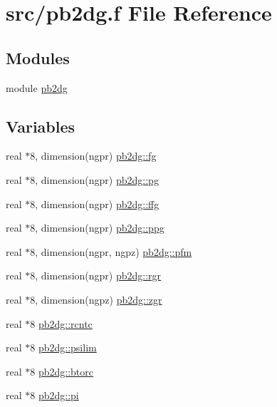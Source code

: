 \hypertarget{pb2dg_8f}{
\section{src/pb2dg.f File Reference}
\label{pb2dg_8f}
}
\subsection*{Modules}
\begin{CompactItemize}
\item 
module \hyperlink{namespacepb2dg}{pb2dg}
\end{CompactItemize}
\subsection*{Variables}
\begin{CompactItemize}
\item 
real $\ast$8, dimension(ngpr) \hyperlink{namespacepb2dg_c4bcb2972129007ba170774e3c4cd6e1}{pb2dg::fg}
\item 
real $\ast$8, dimension(ngpr) \hyperlink{namespacepb2dg_11c0f57d1b6cf88b626a7303b39275b8}{pb2dg::pg}
\item 
real $\ast$8, dimension(ngpr) \hyperlink{namespacepb2dg_8877d818c19720f058d24c97e09aca0a}{pb2dg::ffg}
\item 
real $\ast$8, dimension(ngpr) \hyperlink{namespacepb2dg_759cca590c253be6ad4e8109bb854bc9}{pb2dg::ppg}
\item 
real $\ast$8, dimension(ngpr, ngpz) \hyperlink{namespacepb2dg_74ff9bdb9b47e6aa7d40970f2a1255db}{pb2dg::pfm}
\item 
real $\ast$8, dimension(ngpr) \hyperlink{namespacepb2dg_5018cdbf4ff81bb02ec25414689c7987}{pb2dg::rgr}
\item 
real $\ast$8, dimension(ngpz) \hyperlink{namespacepb2dg_1d7660eee49ff1cdeb8a990886b2bca6}{pb2dg::zgr}
\item 
real $\ast$8 \hyperlink{namespacepb2dg_6b53ad4b2024949719cfea4dd16feda1}{pb2dg::rcntc}
\item 
real $\ast$8 \hyperlink{namespacepb2dg_461caa2db520facf89776aa25ef06cae}{pb2dg::psilim}
\item 
real $\ast$8 \hyperlink{namespacepb2dg_bb98e426dd9cafc894a6572df354a934}{pb2dg::btorc}
\item 
real $\ast$8 \hyperlink{namespacepb2dg_afbfb864348af51164a5b5600c562bf3}{pb2dg::pi}
\end{CompactItemize}

